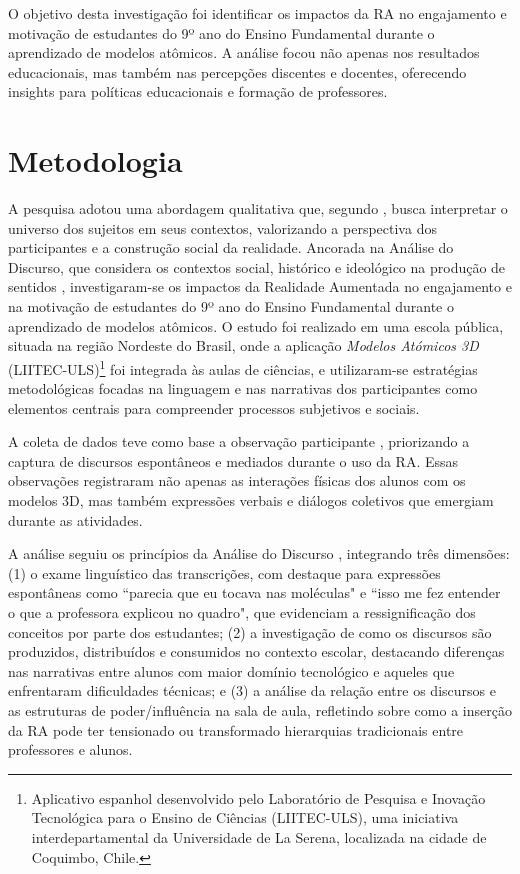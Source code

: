 \documentclass[portuguese]{textolivre}
\begin{document}
O objetivo desta investigação foi identificar os impactos da RA no engajamento e motivação de estudantes do 9º ano do Ensino Fundamental durante o aprendizado de modelos atômicos. A análise focou não apenas nos resultados educacionais, mas também nas percepções discentes e docentes, oferecendo insights para políticas educacionais e formação de professores.

\section{Metodologia}
A pesquisa adotou uma abordagem qualitativa que, segundo \textcite{minayo2012}, busca interpretar o universo dos sujeitos em seus contextos, valorizando a perspectiva dos participantes e a construção social da realidade. Ancorada na Análise do Discurso, que considera os contextos social, histórico e ideológico na produção de sentidos \cite{brandao2009}, investigaram-se os impactos da Realidade Aumentada no engajamento e na motivação de estudantes do 9º ano do Ensino Fundamental durante o aprendizado de modelos atômicos. O estudo foi realizado em uma escola pública, situada na região Nordeste do Brasil, onde a aplicação \emph{Modelos Atómicos 3D} (LIITEC-ULS)\footnote{Aplicativo espanhol desenvolvido pelo Laboratório de Pesquisa e Inovação Tecnológica para o Ensino de Ciências (LIITEC-ULS), uma iniciativa interdepartamental da Universidade de La Serena, localizada na cidade de Coquimbo, Chile.} foi integrada às aulas de ciências, e utilizaram-se estratégias metodológicas focadas na linguagem e nas narrativas dos participantes como elementos centrais para compreender processos subjetivos e sociais.

A coleta de dados teve como base a observação participante \cite{martins1996}, priorizando a captura de discursos espontâneos e mediados durante o uso da RA. Essas observações registraram não apenas as interações físicas dos alunos com os modelos 3D, mas também expressões verbais e diálogos coletivos que emergiam durante as atividades.

A análise seguiu os princípios da Análise do Discurso \cite{brandao2009}, integrando três dimensões: (1) o exame linguístico das transcrições, com destaque para expressões espontâneas como ``parecia que eu tocava nas moléculas" e ``isso me fez entender o que a professora explicou no quadro", que evidenciam a ressignificação dos conceitos por parte dos estudantes; (2) a investigação de como os discursos são produzidos, distribuídos e consumidos no contexto escolar, destacando diferenças nas narrativas entre alunos com maior domínio tecnológico e aqueles que enfrentaram dificuldades técnicas; e (3) a análise da relação entre os discursos e as estruturas de poder/influência na sala de aula, refletindo sobre como a inserção da RA pode ter tensionado ou transformado hierarquias tradicionais entre professores e alunos.
\end{document}
